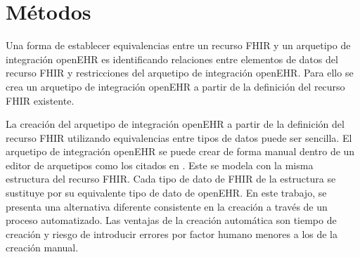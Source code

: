 \section{Métodos}

Una forma de establecer equivalencias entre un recurso FHIR y un arquetipo de integración openEHR es identificando relaciones entre elementos de datos del recurso FHIR y restricciones del arquetipo de integración openEHR. Para ello se crea un arquetipo de integración openEHR a partir de la definición del recurso FHIR existente.

La creación del arquetipo de integración openEHR a partir de la definición del recurso FHIR utilizando equivalencias entre tipos de datos puede ser sencilla. El arquetipo de integración openEHR se puede crear de forma manual dentro de un editor de arquetipos como los citados en \cite{openEHRModellingTools}. Este se modela con la misma estructura del recurso FHIR. Cada tipo de dato de FHIR de la estructura se sustituye por su equivalente tipo de dato de openEHR. En este trabajo, se presenta una alternativa diferente consistente en la creación a través de un proceso automatizado. Las ventajas de la creación automática son tiempo de creación y riesgo de introducir errores por factor humano menores a los de la creación manual.




